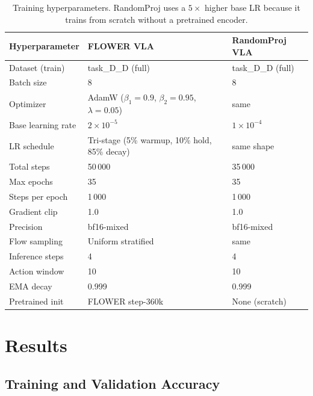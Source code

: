 \documentclass[11pt,a4paper]{article}
\begin{document}
\begin{table}[h]
\centering
{}
\begin{tabular}{lll}
\toprule
\textbf{Hyperparameter} & \textbf{FLOWER VLA} & \textbf{RandomProj VLA} \\
\midrule
Dataset (train)     & task\_D\_D (full) & task\_D\_D (full) \\
Batch size          & 8 & 8 \\
Optimizer           & AdamW ($\beta_1{=}0.9$, $\beta_2{=}0.95$, $\lambda{=}0.05$) & same \\
Base learning rate  & $2\times10^{-5}$ & $1\times10^{-4}$ \\
LR schedule         & Tri-stage (5\% warmup, 10\% hold, 85\% decay) & same shape \\
Total steps         & 50\,000 & 35\,000 \\
Max epochs          & 35 & 35 \\
Steps per epoch     & 1\,000 & 1\,000 \\
Gradient clip       & 1.0 & 1.0 \\
Precision           & bf16-mixed & bf16-mixed \\
Flow sampling       & Uniform stratified & same \\
Inference steps     & 4 & 4 \\
Action window       & 10 & 10 \\
EMA decay           & 0.999 & 0.999 \\
Pretrained init     & FLOWER step-360k & None (scratch) \\
\bottomrule
\end{tabular}
\caption{Training hyperparameters.  RandomProj uses a $5\times$ higher base LR
         because it trains from scratch without a pretrained encoder.}
\label{tab:hparams}
\end{table}

\section{Results}
\label{sec:results}

\subsection{Training and Validation Accuracy}
\label{sec:accuracy}
\end{document}
